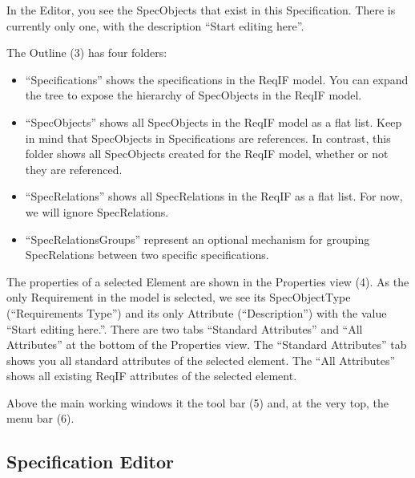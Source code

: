 In the Editor, you see the SpecObjects that exist in this Specification.
There is currently only one, with the description ``Start editing here''.

The Outline (3) has four folders:

\begin{itemize}

\item
  ``Specifications'' shows the specifications in the ReqIF model.  You can
  expand the tree to expose the hierarchy of SpecObjects in the
  ReqIF model.
\item
  ``SpecObjects'' shows all SpecObjects in the ReqIF model as a flat list.
  Keep in mind that SpecObjects in Specifications are references.  In
  contrast, this folder shows all SpecObjects created for the ReqIF model, whether or not they are referenced.
\item
  ``SpecRelations'' shows all SpecRelations in the ReqIF as a flat list.
  For now, we will ignore SpecRelations.
\item
  ``SpecRelationsGroups'' represent an optional mechanism for grouping SpecRelations between two specific specifications.
\end{itemize}

The properties of a selected Element are shown in the Properties view
(4).  As the only Requirement in the model is selected, we see its
SpecObjectType (``Requirements Type'') and its only Attribute
(``Description'') with the value ``Start editing here.''.  There are two
tabs ``Standard Attributes'' and ``All Attributes'' at the bottom of the
Properties view.  \marginpar{*****} The ``Standard Attributes'' tab shows you all standard
attributes of the selected element.  The ``All Attributes'' shows all
existing ReqIF attributes of the selected element.

Above the main working windows it the tool bar (5) and, at the very top, the menu bar (6).

\subsection{Specification Editor}

